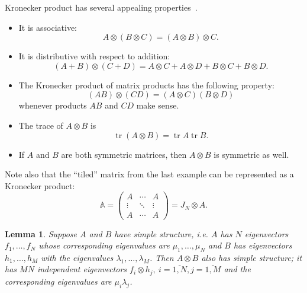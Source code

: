 \documentclass[a4paper]{article}
\newtheorem{lem}{Lemma}
\theoremstyle{definition}
\begin{document}
Kronecker product has several appealing properties~\cite{bellman-matrices-kron}.
\begin{itemize}
\item It is associative:
    \[ A\otimes (B\otimes C) = (A\otimes B)\otimes C. \]
\item It is distributive with respect to addition:
    \[ (A+B)\otimes(C+D) = A\otimes C + A\otimes D + B\otimes C + B\otimes D. \]
\item The Kronecker product of matrix products has the following property:
    \[ (AB)\otimes(CD) = (A\otimes C)(B\otimes D) \]
    whenever products \( AB \) and \( CD \) make sense.
\item The trace of \( A\otimes B \) is \[ \operatorname{tr}(A\otimes B) = \operatorname{tr}A\operatorname{tr}B. \]
\item If \( A \) and \( B \) are both symmetric matrices,
      then \( A\otimes B \) is symmetric as well.
\end{itemize}
Note also that the ``tiled'' matrix from the last example
    can be represented as a Kronecker product:
\[
    \mathbb{A} =
    \begin{pmatrix}
    A & \cdots & A\\
    \vdots & \ddots & \vdots \\
    A & \cdots & A\end{pmatrix} =
        J_N\otimes A.
    \]

\begin{lem}
Suppose \( A \) and \( B \) have simple structure,
    i.e. \( A \) has \( N \) eigenvectors
    \( f_1, \ldots, f_N \)
    whose corresponding eigenvalues are \( \mu_1, \ldots, \mu_N \)
    and \( B \) has eigenvectors \( h_1, \ldots, h_M \)
    with the eigenvalues \( \lambda_1, \ldots, \lambda_M \).
Then \( A\otimes B \) also has simple structure;
    it has \( MN \) independent eigenvectors \( f_i\otimes h_j,\ i{=}\overline{1,N}, j{=}\overline{1,M} \)
    and the corresponding eigenvalues are \( \mu_i \lambda_j \).
\end{lem}
\end{document}
